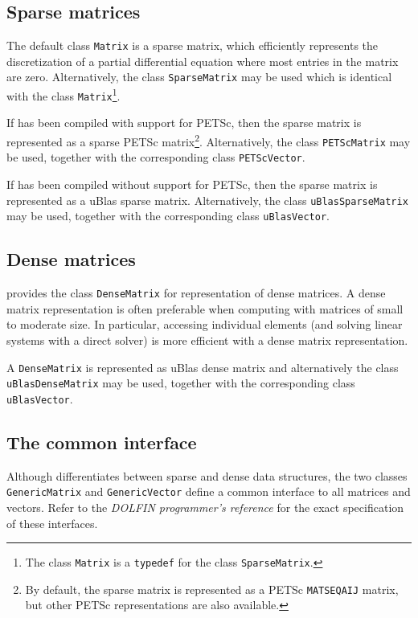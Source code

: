 \subsection{Sparse matrices}

The default \dolfin{} class \texttt{Matrix} is a sparse matrix, which
efficiently represents the discretization of a partial differential
equation where most entries in the matrix are zero. Alternatively,
the class \texttt{SparseMatrix} may be used which is identical with
the class \texttt{Matrix}\footnote{The class \texttt{Matrix} is a
\texttt{typedef} for the class \texttt{SparseMatrix}.}.

If \dolfin{} has been compiled with support for PETSc, then the sparse
matrix is represented as a sparse PETSc matrix\footnote{By default, the
sparse matrix is represented as a PETSc \texttt{MATSEQAIJ} matrix, but
other PETSc representations are also available.}. Alternatively, the
class \texttt{PETScMatrix} may be used, together with the corresponding
class \texttt{PETScVector}.

If \dolfin{} has been compiled without support for PETSc, then the
sparse matrix is represented as a uBlas sparse matrix. Alternatively,
the class \texttt{uBlasSparseMatrix} may be used, together with the
corresponding class \texttt{uBlasVector}.

\subsection{Dense matrices}

\dolfin{} provides the class \texttt{DenseMatrix} for representation
of dense matrices. A dense matrix representation is often preferable
when computing with matrices of small to moderate size. In particular,
accessing individual elements (and solving linear systems with a
direct solver) is more efficient with a dense matrix representation.

A \texttt{DenseMatrix} is represented as uBlas dense matrix and
alternatively the class \texttt{uBlasDenseMatrix} may be used,
together with the corresponding class \texttt{uBlasVector}.

\subsection{The common interface}

Although \dolfin{} differentiates between sparse and dense data
structures, the two classes \texttt{GenericMatrix} and
\texttt{GenericVector} define a common interface to all matrices and
vectors. Refer to the \emph{DOLFIN programmer's reference} for the
exact specification of these interfaces.

